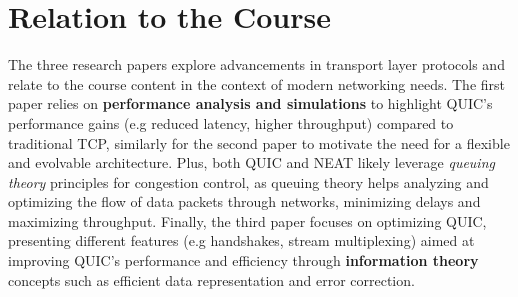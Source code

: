 \section{Relation to the Course}%
\label{sec:Relation to the Course}

The three research papers explore advancements in transport layer protocols and relate to the course content in the context of modern networking needs.
The first paper \cite{langley2017quic} relies on \textbf{performance analysis and simulations} to highlight QUIC's performance gains (e.g reduced latency, higher throughput) compared to traditional TCP, similarly for the second paper \cite{grinnemo2016towards} to motivate the need for a flexible and evolvable architecture. Plus, both QUIC and NEAT likely leverage \textit{queuing theory} principles for congestion control, as queuing theory helps analyzing and optimizing the flow of data packets through networks, minimizing delays and maximizing throughput. Finally, the third paper \cite{kosek2021beyond} focuses on optimizing QUIC, presenting different features (e.g handshakes, stream multiplexing) aimed at improving QUIC's performance and efficiency through \textbf{information theory} concepts such as efficient data representation and error correction. 


